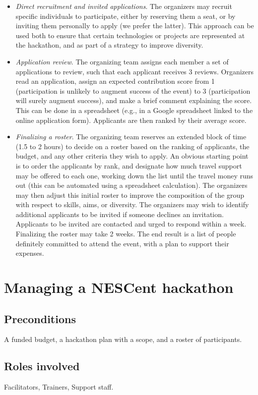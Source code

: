 \documentclass[11pt]{article}
\begin{document}
\begin{itemize}
\item	{\em Direct recruitment and invited applications}. The organizers may recruit specific individuals to participate, either by reserving them a seat, or by inviting them personally to apply (we prefer the latter). This approach can be used both to ensure that certain technologies or projects are represented at the hackathon, and as part of a strategy to improve diversity. 
\item	{\em Application review}. The organizing team assigns each member a set of applications to review, such that each applicant receives 3 reviews. Organizers read an application, assign an expected contribution score from 1 (participation is unlikely to augment success of the event) to 3 (participation will surely augment success), and make a brief comment explaining the score. This can be done in a spreadsheet (e.g., in a Google spreadsheet linked to the online application form). Applicants are then ranked by their average score. 
\item	{\em Finalizing a roster}. The organizing team reserves an extended block of time (1.5 to 2 hours) to decide on a roster based on the ranking of applicants, the budget, and any other criteria they wish to apply. An obvious starting point is to order the applicants by rank, and designate how much travel support may be offered to each one, working down the list until the travel money runs out (this can be automated using a spreadsheet calculation). The organizers may then adjust this initial roster to improve the composition of the group with respect to skills, aims, or diversity. The organizers may wish to identify additional applicants to be invited if someone declines an invitation. Applicants to be invited are contacted and urged to respond within a week. Finalizing the roster may take 2 weeks. The end result is a list of people definitely committed to attend the event, with a plan to support their expenses.  
\end{itemize}

\newpage
\section{Managing a NESCent hackathon}
\subsection{Preconditions}
A funded budget, a hackathon plan with a scope, and a roster of participants. 
\subsection{Roles involved}
Facilitators, Trainers, Support staff. 
\end{document}
